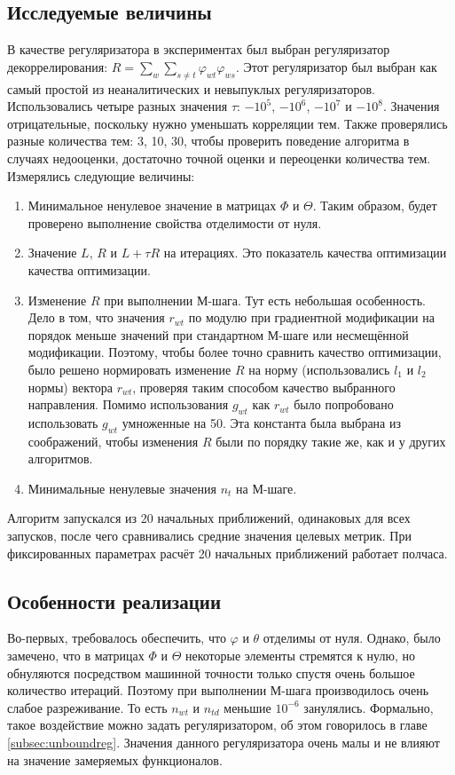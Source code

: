 \documentclass[12pt]{article}
\renewcommand{\phi}{\varphi}
\begin{document}
\subsection{Исследуемые величины}
В качестве регуляризатора в экспериментах был выбран регуляризатор декоррелирования: $R = \sum_w \sum_{s \neq t} \phi_{wt} \phi_{ws}$. Этот регуляризатор был выбран как самый простой из неаналитических и невыпуклых регуляризаторов. Использовались четыре разных значения $\tau$: $-10^5$, $-10^6$, $-10^7$ и $-10^8$. Значения отрицательные, поскольку нужно уменьшать корреляции тем. Также проверялись разные количества тем: 3, 10, 30, чтобы проверить поведение алгоритма в случаях недооценки, достаточно точной оценки и переоценки  количества тем. Измерялись следующие величины:
\begin{enumerate}
\item Минимальное ненулевое значение в матрицах $\Phi$ и $\Theta$. Таким образом, будет проверено выполнение свойства отделимости от нуля.
\item Значение $L$, $R$ и $L + \tau R$ на итерациях. Это показатель качества оптимизации качества оптимизации.
\item Изменение $R$ при выполнении М-шага. Тут есть  небольшая особенность. Дело в том, что значения $r_{wt}$ по модулю  при градиентной модификации на порядок меньше значений при стандартном М-шаге или несмещённой модификации. Поэтому, чтобы более точно сравнить качество оптимизации,  было решено нормировать изменение $R$ на норму (использовались $l_1$ и $l_2$ нормы) вектора $r_{wt}$, проверяя таким способом качество выбранного направления. Помимо использования $g_{wt}$ как $r_{wt}$ было попробовано использовать $g_{wt}$ умноженные на 50. Эта константа была выбрана из соображений, чтобы изменения $R$ были по порядку такие же, как и у других алгоритмов.
\item Минимальные ненулевые значения $n_t$  на М-шаге.
\end{enumerate}

Алгоритм  запускался из 20 начальных приближений, одинаковых для всех запусков, после чего сравнивались средние значения целевых метрик. При фиксированных параметрах расчёт 20 начальных приближений работает полчаса.

\subsection{Особенности реализации}
\label{technical}
Во-первых, требовалось обеспечить, что $\phi$ и $\theta$ отделимы от нуля. Однако, было замечено, что в матрицах $\Phi$ и $\Theta$ некоторые элементы стремятся к нулю, но обнуляются посредством машинной точности только спустя очень большое количество итераций. Поэтому при выполнении М-шага производилось очень слабое разреживание. То есть  $n_{wt}$ и $n_{td}$ меньшие $10^{-6}$ занулялись. Формально, такое воздействие можно задать регуляризатором, об этом говорилось в главе \ref{subsec:unboundreg}. Значения данного регуляризатора очень малы и не влияют на значение замеряемых функционалов.
\end{document}
